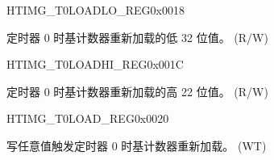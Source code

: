 \begin{register}{H}{TIMG\_T0LOADLO\_REG}{0x0018}\label{regdesc:TIMGTXLOADLOREG}
%
\regnewline%
\begin{regdesc}\begin{reglist}
\label{fielddesc:TIMGTXLOADLO}\item [TIMG\_T0\_LOAD\_LO] 定时器 0  时基计数器重新加载的低 32 位值。 (R/W)
\end{reglist}\end{regdesc}
\end{register}


\begin{register}{H}{TIMG\_T0LOADHI\_REG}{0x001C}\label{regdesc:TIMGTXLOADHIREG}
%
%
\regnewline%
\begin{regdesc}\begin{reglist}
\label{fielddesc:TIMGTXLOADHI}\item [TIMG\_T0\_LOAD\_HI] 定时器 0  时基计数器重新加载的高 22 位值。 (R/W)
\end{reglist}\end{regdesc}
\end{register}


\begin{register}{H}{TIMG\_T0LOAD\_REG}{0x0020}\label{regdesc:TIMGTXLOADREG}
%
\regnewline%
\begin{regdesc}\begin{reglist}
\label{fielddesc:TIMGTXLOAD}\item [TIMG\_T0\_LOAD] 写任意值触发定时器 0  时基计数器重新加载。 (WT)
\end{reglist}\end{regdesc}
\end{register}


